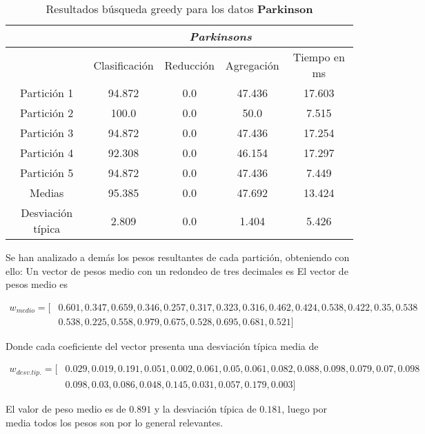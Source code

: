   \begin{table}[H]
    \centering
    \begin{tabular}{|c|c|c|c|c|}
      \hline
      & \multicolumn{4}{|c|}{\textit{Parkinsons}}  \\
      \hline
      &	Clasificación &		Reducción	
      &	Agregación	&	Tiempo en ms \\
      \hline
      Partición 1	&    94.872  &  0.0  &  47.436  &  17.603   \\
      Partición 2 &	   100.0  &  0.0  &  50.0  &  7.515   \\
      Partición 3 &    94.872  &  0.0  &  47.436  &  17.254    \\
      Partición 4	&    92.308  &  0.0  &  46.154  &  17.297  \\
      Partición 5	&    94.872  &  0.0  &  47.436  &  7.449   \\
      \hline
      Medias 	 &    95.385  &  0.0  &  47.692  &  13.424   \\
      \hline
      Desviación típica &	   2.809  &  0.0  &  1.404  &  5.426   \\ 
      \hline  
    \end{tabular}
    \caption{Resultados búsqueda greedy para los datos \textbf{Parkinson}}
    \label{table:greedy_parkinson}
  \end{table}
  
  Se han analizado a demás los pesos resultantes de cada partición, obteniendo con ello: 
  Un vector de pesos medio con un redondeo de tres decimales es 
  El vector de pesos medio es 

\begin{align*}
  w_{medio} = [ 
    & 0.601, 0.347, 0.659, 0.346, 0.257, 0.317, 0.323, 0.316, 0.462, 0.424, 0.538, 0.422, 0.35, 0.538 \\
    & 0.538, 0.225, 0.558, 0.979, 0.675, 0.528, 0.695, 0.681, 0.521]
  \end{align*}
  
  Donde cada coeficiente del vector presenta una desviación típica media de 
  
  \begin{align*}
    w_{desv. tip.} = [ 
      & 0.029, 0.019, 0.191, 0.051, 0.002, 0.061, 0.05, 0.061, 0.082, 0.088, 0.098, 0.079, 0.07, 0.098 \\
      & 0.098, 0.03, 0.086, 0.048, 0.145, 0.031, 0.057, 0.179, 0.003
     ]
\end{align*}

El valor de peso medio es de $0.891$ y la desviación típica de $0.181$, luego por media todos los pesos son por lo general relevantes. 

